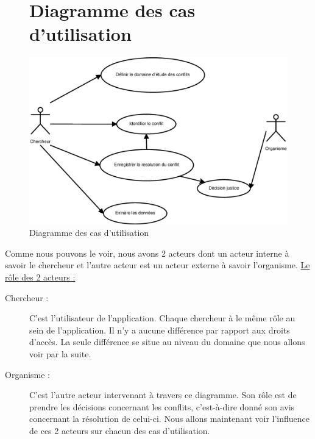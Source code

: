 \documentclass[12pt,a4paper]{article}
\begin{document}
\clearpage
\begin{figure}
\section{Diagramme des cas d'utilisation}
\vspace{0.5cm}
\centering
\includegraphics[scale=0.4]{Image/CU.eps}
\caption{Diagramme des cas d'utilisation}
\end{figure}

\vspace{1cm}
Comme nous pouvons le voir, nous avons 2 acteurs dont un acteur interne à savoir le chercheur et l'autre acteur est un acteur externe à savoir l'organisme. \newline
\underline{Le rôle des 2 acteurs :}
\begin{description}
\item[Chercheur :]C'est l'utilisateur de l'application. Chaque chercheur à le même rôle au sein de l'application. Il n'y a aucune différence par rapport aux droits d'accès. La seule différence se situe au niveau du domaine que nous allons voir par la suite.
\item[Organisme :] C'est l'autre acteur intervenant à travers ce diagramme. Son rôle est de prendre les décisions concernant les conflits, c'est-à-dire donné son avis concernant la résolution de celui-ci. \newline\newline
Nous allons maintenant voir l'influence de ces 2 acteurs sur chacun des cas d'utilisation.
\end{description}
\end{document}
